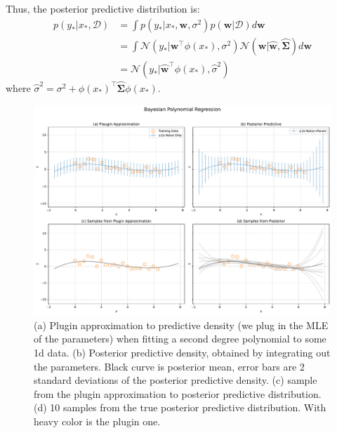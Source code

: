 \documentclass[11pt, a4paper, oneside]{memoir}
\begin{document}
Thus, the posterior predictive distribution is:
\begin{align*}
    p(y_* | x_*, \mathcal{D}) & = \int p(y_* | x_*, \boldsymbol{w}, \sigma^2) p(\boldsymbol{w} | \mathcal{D}) d\boldsymbol{w}                                                                               \\
                              & = \int \mathcal{N}(y_* | \boldsymbol{w}^\top \phi(x_*), \sigma^2) \mathcal{N}(\boldsymbol{w} | \wideparen{\boldsymbol{w}}, \wideparen{\boldsymbol{\Sigma}}) d\boldsymbol{w} \\
                              & = \mathcal{N}(y_* | \wideparen{\boldsymbol{w}}^\top \phi(x_*), \wideparen{\sigma}^2)
\end{align*}
where $\wideparen{\sigma}^2 = \sigma^2 + \phi(x_*)^\top \wideparen{\boldsymbol{\Sigma}} \phi(x_*)$.

\newpage
\begin{figure}[H]
    \centering
    \includegraphics[width=\textwidth]{code/result/problem9.pdf}
    \caption{(a) Plugin approximation to predictive density (we plug in the MLE of the parameters) when fitting a second degree polynomial to some 1d data.
        (b) Posterior predictive density, obtained by integrating out the parameters. Black curve is posterior mean, error bars are 2 standard deviations of the posterior predictive density.
        (c) sample from the plugin approximation to posterior predictive distribution.
        (d) 10 samples from the true posterior predictive distribution. With heavy color is the plugin one.}
    \label{fig:problem9}
\end{figure}
\end{document}
